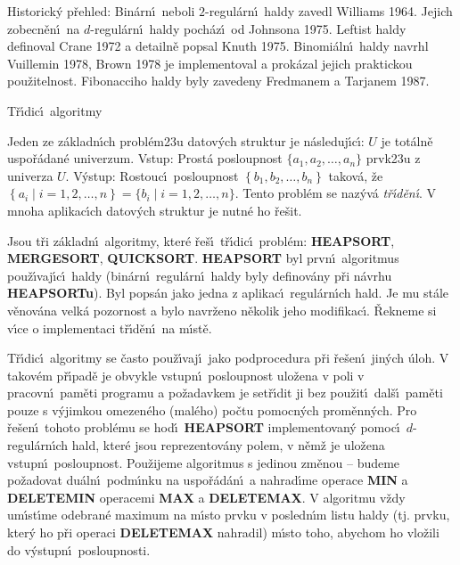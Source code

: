 \flushpar Historick\'y p\v rehled: Bin\'arn\'\i\ neboli $2$-regul\'arn\'\i\ 
haldy zavedl Williams 1964. Jejich zobecn\v e\-n\'\i\ na $d$-regul\'arn\'\i\ 
haldy poch\'az\'\i\ od Johnsona 1975. Leftist haldy definoval Crane 1972 
a detailn\v e popsal Knuth 1975. Binomi\'aln\'\i\ haldy navrhl Vuillemin 1978, 
Brown 1978 je implementoval a prok\'azal jejich praktickou pou\v zitelnost. 
Fibonacciho haldy byly zavedeny Fredmanem a Tarjanem 1987.
  
\heading
T\v r\'\i dic\'\i\ algoritmy
\endheading

\flushpar Jeden ze z\'akladn\'\i ch probl\'em\accent23u datov\'ych 
struktur je n\'asleduj\'\i c\'\i :\newline 
$U$ je tot\'aln\v e uspo\v r\'adan\'e univerzum.\newline 
Vstup: Prost\'a posloupnost $\{a_1,a_2,\dots,a_n\}$ prvk\accent23u z 
univerza $U$.\newline 
V\'ystup: Rostouc\'\i\ posloupnost $\left\{b_1,b_2,\dots,b_n\right\}$ takov\'a, \v ze 
$\left\{a_i\mid i=1,2,\dots,n\right\}=\{b_i\mid i=1,2,\dots,n\}$.
Tento probl\'em se naz\'yv\'a \emph{t\v r\'\i d\v en\'\i}. V mnoha 
aplikac\'\i ch datov\'ych struktur je nutn\'e ho \v re\v sit. 
\medskip

\flushpar Jsou t\v ri z\'akladn\'\i\ algoritmy, kter\'e  \v re\v s\'\i\ t\v r\'\i dic\'\i\ 
probl\'em: {\bf HEAP\-SORT}, {\bf MERGESORT}, {\bf QUICKSORT}. 
{\bf HEAPSORT} byl prvn\'\i\ algoritmus pou\v z\'\i vaj\'\i c\'\i\ 
haldy (bin\'arn\'\i\ regul\'ar\-n\'\i\ haldy by\-ly definov\'any p\v ri 
n\'avrhu {\bf HEAP\-SORTu}). Byl pops\'an jako jedna z 
aplikac\'\i\ regul\'arn\'\i ch hald. Je mu  
st\'ale v\v enov\'ana velk\'a pozornost a bylo navr\v ze\-no n\v ekolik 
jeho modifikac\'\i . \v Rekneme si v\'\i ce o implementaci 
t\v r\'\i d\v en\'\i\ na m\'\i st\v e.
\medskip

\flushpar T\v r\'\i dic\'\i\ algoritmy se \v casto pou\v z\'\i vaj\'\i\ jako 
podprocedura p\v ri \v re\-\v se\-n\'\i\ jin\'ych \'uloh. V takov\'em p\v r\'\i pad\v e je 
obvykle vstupn\'\i\ posloupnost ulo\v zena v poli v pracovn\'\i\ 
pam\v eti programu a po\v za\-dav\-kem  je set\v r\'\i dit ji 
bez pou\v zit\'\i\ dal\v s\'\i\ 
pam\v eti pouze s v\'yjimkou omezen\'eho (mal\'eho) po\v ctu pomocn\'ych 
prom\v enn\'ych. Pro \v re\v se\-n\'\i\ tohoto probl\'emu se hod\'\i\ 
{\bf HEAPSORT} implementovan\'y pomoc\'\i\ 
$d$-regul\'arn\'\i ch hald, kter\'e jsou reprezentov\'any  
polem, v n\v em\v z je ulo\v zena vstupn\'\i\ posloupnost. Pou\v zijeme 
algoritmus s jedinou zm\v enou -- budeme po\v zadovat du\'aln\'\i\ 
podm\'\i nku na uspo\v r\'ad\'an\'\i\ 
a nahrad\'\i me operace {\bf MIN} a {\bf DELETEMIN }
ope\-racemi {\bf MAX} a {\bf DELETEMAX}. V algoritmu v\v zdy um\'\i st\'\i\-me 
odebran\'e maximum na m\'\i sto prvku v posled\-n\'\i m listu 
haldy (tj. prvku, kter\'y ho p\v ri operaci {\bf DELETEMAX }
nahradil) m\'\i sto toho, abychom ho vlo\v zili 
do v\'ystupn\'\i\ posloupnosti. 
\medskip

